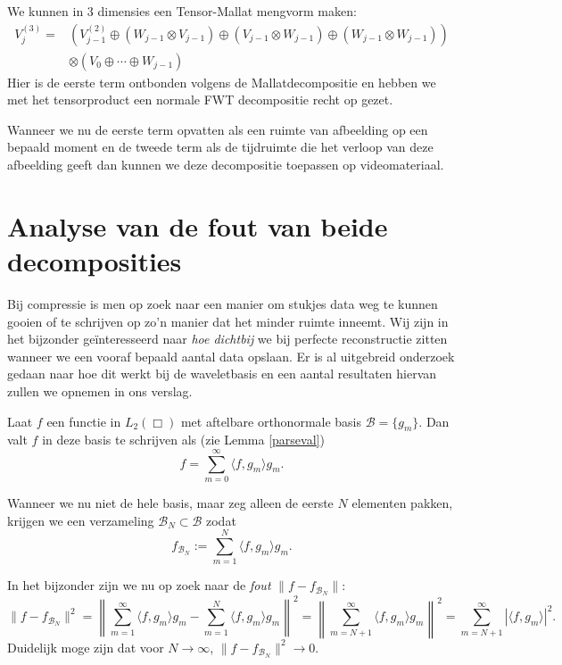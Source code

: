 \begin{voorbeeld}
We kunnen in 3 dimensies een Tensor-Mallat mengvorm maken:
\begin{equation}
\label{3d_mengvorm}
\begin{split}
V_j^{(3)} = &
\left (V^{(2)}_{j-1} 
\oplus (W_{j-1}\otimes V_{j-1}) 
\oplus (V_{j-1}\otimes W_{j-1}) 
\oplus (W_{j-1}\otimes W_{j-1}) \right ) \\
&\otimes (V_0\oplus\cdots\oplus W_{j-1})
\end{split}
\end{equation}
Hier is de eerste term ontbonden volgens de Mallatdecompositie en hebben we met het tensorproduct
een normale FWT decompositie recht op gezet.
\end{voorbeeld}
\begin{gevolg}
Wanneer we nu de eerste term opvatten als een ruimte van afbeelding op een bepaald moment en
de tweede term als de tijdruimte die het verloop van deze afbeelding geeft dan kunnen we deze
decompositie toepassen op videomateriaal. 
\end{gevolg}

\section{Analyse van de fout van beide decomposities}
\label{daling_wavelet}

Bij compressie is men op zoek naar een manier om stukjes data weg te kunnen gooien of te schrijven op zo'n manier dat het minder ruimte inneemt. Wij zijn in het bijzonder ge\"interesseerd naar \emph{hoe dichtbij} we bij perfecte reconstructie zitten wanneer we een vooraf bepaald aantal data opslaan. Er is al uitgebreid onderzoek gedaan naar hoe dit werkt bij de waveletbasis en een aantal resultaten hiervan zullen we opnemen in ons verslag.

Laat $f$ een functie in $L_2(\Box)$ met aftelbare orthonormale basis $\mathcal{B} = \{ g_m \}$. Dan valt $f$ in deze basis te schrijven als (zie Lemma \ref{parseval})
\[
f = \sum_{m = 0}^\infty \langle f, g_m \rangle g_m.
\]

\begin{gevolg}
\label{linfout}
Wanneer we nu niet de hele basis, maar zeg alleen de eerste $N$ elementen pakken, krijgen we een verzameling $\mathcal{B}_N \subset \mathcal{B}$ zodat
\[
f_{\mathcal{B}_N} := \sum_{m = 1}^N \langle f, g_m \rangle g_m.
\]

In het bijzonder zijn we nu op zoek naar de \emph{fout} $\| f - f_{\mathcal{B}_N} \|$:
\[
\| f - f_{\mathcal{B}_N} \|^2 = \left\| \sum_{m=1}^\infty\langle f, g_m \rangle g_m - \sum_{m=1}^N \langle f, g_m \rangle g_m \right\|^2 = \left\| \sum_{m=N+1}^\infty\langle f, g_m \rangle g_m \right\|^2 = \sum_{m=N+1}^\infty | \langle f, g_m \rangle |^2.
\]
Duidelijk moge zijn dat voor $N \to \infty$, $\| f - f_{\mathcal{B}_N} \|^2 \to 0$.
\end{gevolg}

